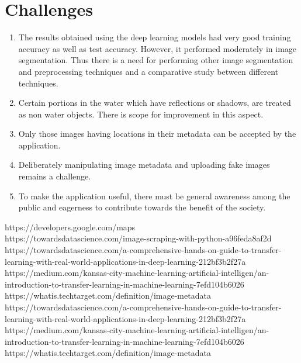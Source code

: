 \documentclass[12pt]{article}
\begin{document}
\section{Challenges}
\begin{enumerate}
\item The results obtained using the deep learning models had very good training accuracy as well as test accuracy. However, it performed moderately in image segmentation. Thus there is a need for performing other image segmentation and preprocessing     techniques and a comparative study between different techniques.
\item Certain portions in the water which have reflections or shadows, are treated as non water objects. There is scope for improvement in this aspect.
\item Only those images having locations in their metadata can be accepted by the application.
\item Deliberately manipulating image metadata and uploading fake images remains a challenge. 
\item To make the application useful, there must be general awareness among the public and eagerness to contribute towards the benefit of the society. 
\end{enumerate}

	

https://developers.google.com/maps\\
https://towardsdatascience.com/image-scraping-with-python-a96feda8af2d
\\
https://towardsdatascience.com/a-comprehensive-hands-on-guide-to-transfer-learning-with-real-world-applications-in-deep-learning-212bf3b2f27a\\
https://medium.com/kansas-city-machine-learning-artificial-intelligen/an-introduction-to-transfer-learning-in-machine-learning-7efd104b6026\\
https://whatis.techtarget.com/definition/image-metadata\\
https://towardsdatascience.com/a-comprehensive-hands-on-guide-to-transfer-learning-with-real-world-applications-in-deep-learning-212bf3b2f27a
\\
https://medium.com/kansas-city-machine-learning-artificial-intelligen/an-introduction-to-transfer-learning-in-machine-learning-7efd104b6026
\\
https://whatis.techtarget.com/definition/image-metadata

\end{document}
